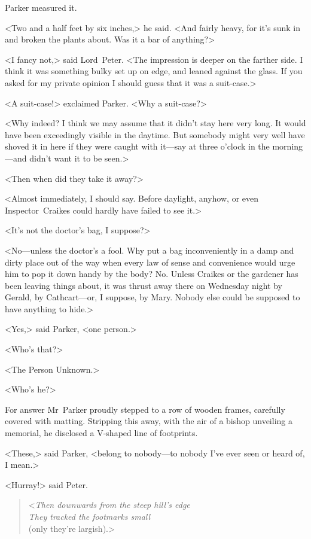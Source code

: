 Parker measured it.

<Two and a half feet by six inches,> he said. <And fairly heavy, for it's sunk in and broken the plants about. Was it a bar of anything?>

<I fancy not,> said Lord~Peter. <The impression is deeper on the farther side. I think it was something bulky set up on edge, and leaned against the glass. If you asked for my private opinion I should guess that it was a suit-case.>

<A suit-case!> exclaimed Parker. <Why a suit-case?>

<Why indeed? I think we may assume that it didn't stay here very long. It would have been exceedingly visible in the daytime. But somebody might very well have shoved it in here if they were caught with it—say at three o'clock in the morning—and didn't want it to be seen.>

<Then when did they take it away?>

<Almost immediately, I should say. Before daylight, anyhow, or even Inspector~Craikes could hardly have failed to see it.>

<It's not the doctor's bag, I suppose?>

<No—unless the doctor's a fool. Why put a bag inconveniently in a damp and dirty place out of the way when every law of sense and convenience would urge him to pop it down handy by the body? No. Unless Craikes or the gardener has been leaving things about, it was thrust away there on Wednesday night by Gerald, by Cathcart—or, I suppose, by Mary. Nobody else could be supposed to have anything to hide.>

<Yes,> said Parker, <one person.>

<Who's that?>

<The Person Unknown.>

<Who's he?>

For answer Mr~Parker proudly stepped to a row of wooden frames, carefully covered with matting. Stripping this away, with the air of a bishop unveiling a memorial, he disclosed a V-shaped line of footprints.

<These,> said Parker, <belong to nobody—to nobody I've ever seen or heard of, I mean.>

\begin{letter}
	\enlargethispage{\baselineskip}
\end{letter}

<Hurray!> said Peter.

\begin{quote}
\vspace{-2ex}
<\textit{Then downwards from the steep hill's edge\\They tracked the footmarks small}\\(only they're largish).>
\end{quote}
\vspace{-2ex}

